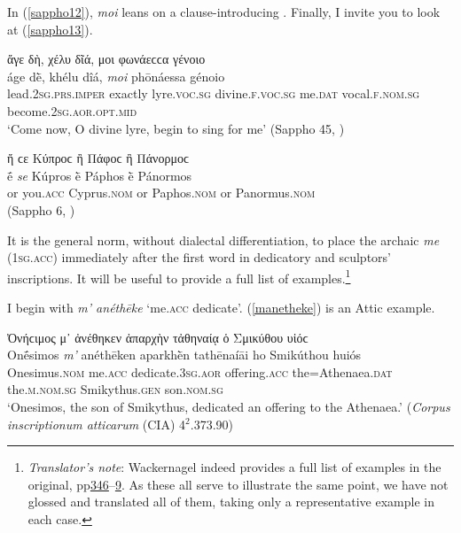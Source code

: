 In (\ref{sappho12}), \textit{moi} leans on a clause-introducing . Finally, I invite you to look at (\ref{sappho13}).

\begin{exe}
\ex ἄγε δὴ, χέλυ δῖά, {μοι} φωνάεϲϲα γένοιο\\
\gll áge dḕ, khélu dîá, \emph{moi} phōnáessa génoio\\
lead.\textsc{2sg.prs.imper} exactly lyre.\textsc{voc.sg} divine.\textsc{f.voc.sg} me.\textsc{dat} vocal.\textsc{f.nom.sg} become.\textsc{2sg.aor.opt.mid}\\
\trans `Come now, O divine lyre, begin to sing for me' (Sappho 45, \citealp[118.1]{LobelPage1968})
\label{sappho12}
\end{exe}

\begin{exe}
\ex ἤ {ϲε} Κύπροϲ ἢ Πάφοϲ ἢ Πάνορμοϲ\\
\gll ḗ \emph{se} Kúpros ḕ Páphos ḕ Pánormos\\
or you.\textsc{acc} Cyprus.\textsc{nom} or Paphos.\textsc{nom} or Panormus.\textsc{nom}\\
\trans (Sappho 6, \citealp[35.1]{LobelPage1968})
\label{sappho13}
\end{exe}

It is the general norm, without dialectal differentiation, to place the archaic \citep[13]{Klein1887} \textit{me} (\textsc{1sg.acc}) immediately after the first word in dedicatory and sculptors' inscriptions. It will be useful to provide a full list of examples.\label{forAddenda1}\footnote{\emph{Translator's note}: Wackernagel indeed provides a full list of examples in the original, pp\hyperlink{p346}{346}--\hyperlink{p349}{9}. As these all serve to illustrate the same point, we have not glossed and translated all of them, taking only a representative example in each case.}

I begin with \emph{m' anéthēke} `me.\textsc{acc} dedicate'. (\ref{manetheke}) is an Attic example.

\begin{exe}
\ex Ὀνήϲιμος μ᾽ ἀνέθηκεν ἀπαρχὴν τἀθηναίᾳ ὁ Σμικύθου υἱόϲ\\
\gll Onḗsimos \emph{m'} anéthēken aparkhḕn tathēnaíāi ho Smikúthou huiós\\
Onesimus.\textsc{nom} me.\textsc{acc} dedicate.\textsc{3sg.aor} offering.\textsc{acc} the=Athenaea.\textsc{dat} the.\textsc{m.nom.sg} Smikythus.\textsc{gen} son.\textsc{nom.sg}\\
\trans `Onesimos, the son of Smikythus, dedicated an offering to the Athenaea.' (\emph{Corpus inscriptionum atticarum} (CIA) 4$^2$.373.90)
\label{manetheke}
\end{exe}

